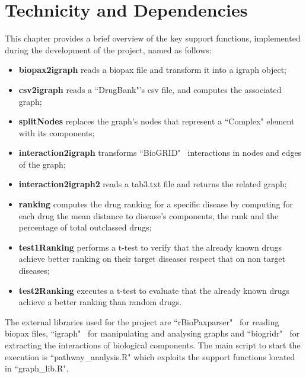 \chapter{Technicity and Dependencies}\label{chap:implementation}
This chapter provides a brief overview of the key support functions, implemented  during the development of the project, named as follows:
\begin{itemize}
    \item \textbf{biopax2igraph} reads a biopax file and transform it into a igraph object;
    \item \textbf{csv2igraph} reads a ``DrugBank"'s csv file, and computes the associated graph;
    \item \textbf{splitNodes} replaces the graph's nodes that represent a ``Complex" element with its components;
    \item \textbf{interaction2igraph} transforms ``BioGRID"~\cite{biogrid} interactions in nodes and edges of the graph;
    \item \textbf{interaction2igraph2} reads a tab3.txt file and returns the related graph;
    \item \textbf{ranking} computes the drug ranking for a specific disease by computing for each drug the mean distance to disease's components, the rank and the percentage of total outclassed drugs;
    \item \textbf{test1Ranking} performs a t-test to verify that the already known drugs achieve better ranking on their target diseases respect that on non target diseases;
    \item \textbf{test2Ranking} executes a t-test to evaluate that the already known drugs achieve a better ranking than random drugs.
\end{itemize}

The external libraries used for the project are ``rBioPaxparser"~\cite{rbiopax} for reading biopax files, ``igraph"~\cite{igraph} for manipulating and analysing graphs and ``biogridr"~\cite{biogridr} for extracting the interactions of biological components. The main script to start the execution is ``pathway\_analysis.R" which exploits the support functions located in ``graph\_lib.R".